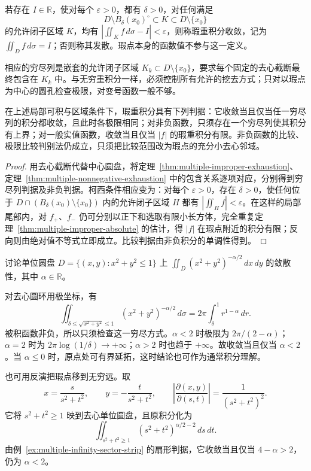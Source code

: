 \documentclass[UTF8,12pt,a4paper,fontset=fandol]{ctexbook}
\begin{document}
\begin{definition}
\label{def:multiple-singular-integral}
若存在 $I\in\mathbb R$，使对每个 $\varepsilon>0$，都有 $\delta>0$，对任何满足
\[
    D\setminus B_\delta(x_0)^\circ\subset K\subset D\setminus\{x_0\}
\]
的允许闭子区域 $K$，均有 $|\iint_Kf\,d\sigma-I|<\varepsilon$，则称瑕重积分收敛，记为 $\iint_Df\,d\sigma=I$；否则称其发散。瑕点本身的函数值不参与这一定义。
\end{definition}

相应的穷尽列是嵌套的允许闭子区域 $K_k\subset D\setminus\{x_0\}$，要求每个固定的去心截断最终包含在 $K_k$ 中。与无穷重积分一样，必须控制所有允许的挖去方式；只对以瑕点为中心的圆孔检查极限，对变号函数一般不够。

\begin{theorem}
\label{thm:multiple-singular-criteria}
在上述局部可积与区域条件下，瑕重积分具有下列判据：它收敛当且仅当任一穷尽列的积分都收敛，且此时各极限相同；对非负函数，只须存在一个穷尽列使其积分有上界；对一般实值函数，收敛当且仅当 $|f|$ 的瑕重积分有限。非负函数的比较、极限比较判别法仍成立，只须把比较范围改为瑕点的充分小去心邻域。
\end{theorem}
\begin{proof}
用去心截断代替中心圆盘，将定理~\ref{thm:multiple-improper-exhaustion}、定理~\ref{thm:multiple-nonnegative-exhaustion} 中的包含关系逐项对应，分别得到穷尽列判据及非负判据。柯西条件相应变为：对每个 $\varepsilon>0$，存在 $\delta>0$，使任何位于 $D\cap(B_\delta(x_0)\setminus\{x_0\})$ 内的允许闭子区域 $H$ 都有 $|\iint_Hf|<\varepsilon$。在这样的局部尾部内，对 $f_+$、$f_-$ 仍可分别以正下和选取有限小长方体，完全重复定理~\ref{thm:multiple-improper-absolute} 的估计，得 $|f|$ 在瑕点附近的积分有限；反向则由绝对值不等式立即成立。比较判据由非负积分的单调性得到。
\end{proof}

\begin{example}
\label{ex:multiple-singular-radial-power}
讨论单位圆盘 $D=\{(x,y):x^2+y^2\leq1\}$ 上 $\displaystyle\iint_D(x^2+y^2)^{-\alpha/2}\,dx\,dy$ 的敛散性，其中 $\alpha\in\mathbb R$。
\end{example}
\begin{solve}
对去心圆环用极坐标，有
\[
    \iint_{\delta\leq\sqrt{x^2+y^2}\leq1}
    (x^2+y^2)^{-\alpha/2}\,d\sigma
    =2\pi\int_\delta^1r^{1-\alpha}\,dr.
\]
被积函数非负，所以只须检查这一穷尽方式。$\alpha<2$ 时极限为 $2\pi/(2-\alpha)$；$\alpha=2$ 时为 $2\pi\log(1/\delta)\to+\infty$；$\alpha>2$ 时也趋于 $+\infty$。故收敛当且仅当 $\alpha<2$。当 $\alpha\leq0$ 时，原点处可有界延拓，这时结论也可作为通常积分理解。

也可用反演把瑕点移到无穷远。取
\[
    x=\frac{s}{s^2+t^2},\qquad y=-\frac{t}{s^2+t^2},\qquad
    \left|\frac{\partial(x,y)}{\partial(s,t)}\right|
    =\frac1{(s^2+t^2)^2}.
\]
它将 $s^2+t^2\geq1$ 映到去心单位圆盘，且原积分化为
\[
    \iint_{s^2+t^2\geq1}(s^2+t^2)^{\alpha/2-2}\,ds\,dt.
\]
由例~\ref{ex:multiple-infinity-sector-strip} 的扇形判据，它收敛当且仅当 $4-\alpha>2$，仍为 $\alpha<2$。
\end{solve}
\end{document}

